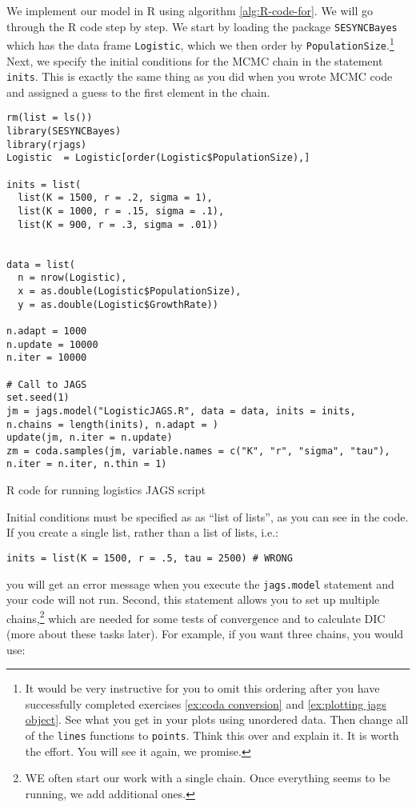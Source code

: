 \documentclass[12pt,english]{article}
\begin{document}
We implement our model in R using algorithm \ref{alg:R-code-for}. We will go through the R code step by step. We start by loading the package \texttt{SESYNCBayes} which has the data frame \texttt{Logistic}, which we then order by \texttt{PopulationSize}.\footnote{It would be very instructive for you to omit this ordering after you have successfully completed exercises \ref{ex:coda conversion} and \ref{ex:plotting jags object}. See what you get in your plots using unordered data. Then change all of the \texttt{lines} functions to \texttt{points}. Think this over and explain it. It is worth the effort. You will see it again, we promise.} Next, we specify the initial conditions for the MCMC chain in the statement \texttt{inits}. This is exactly the same thing as you did when you wrote MCMC code and assigned a guess to the first element in the chain. 

\begin{algorithm}
\begin{Verbatim}[frame=single]
rm(list = ls())
library(SESYNCBayes)
library(rjags)
Logistic  = Logistic[order(Logistic$PopulationSize),]

inits = list(
  list(K = 1500, r = .2, sigma = 1),
  list(K = 1000, r = .15, sigma = .1),
  list(K = 900, r = .3, sigma = .01))


data = list(
  n = nrow(Logistic),
  x = as.double(Logistic$PopulationSize),
  y = as.double(Logistic$GrowthRate))

n.adapt = 1000
n.update = 10000
n.iter = 10000

# Call to JAGS
set.seed(1)
jm = jags.model("LogisticJAGS.R", data = data, inits = inits, 
n.chains = length(inits), n.adapt = )
update(jm, n.iter = n.update)
zm = coda.samples(jm, variable.names = c("K", "r", "sigma", "tau"),
n.iter = n.iter, n.thin = 1)
\end{Verbatim}
\caption{R code for running logistics JAGS script}
\label{alg:R-code-for}
\end{algorithm}

Initial conditions must be specified as as \enquote{list of lists}, as you can see in the code. If you create a single list, rather than a list of lists, i.e.:

\begin{Verbatim}
inits = list(K = 1500, r = .5, tau = 2500) # WRONG
\end{Verbatim}

\noindent you will get an error message when you execute the \texttt{jags.model} statement and your code will not run. Second, this statement allows you to set up multiple chains,\footnote{WE often start our work with a single chain. Once everything seems to be running, we add additional ones.} which are needed for some tests of convergence and to calculate DIC (more about these tasks later). For example, if you want three chains, you would use:
\end{document}
